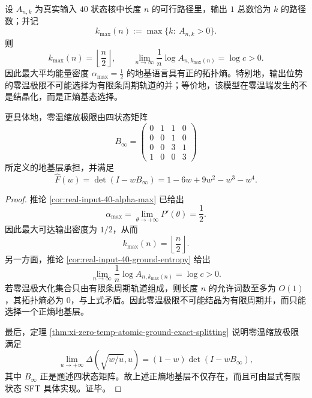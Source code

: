 \begin{theorem}[零温极限的非结晶化选择]\label{thm:conclusion-realinput40-zero-temp-noncrystallization}
设 \(A_{n,k}\) 为真实输入 \(40\) 状态核中长度 \(n\) 的可行路径里，输出 \(1\) 总数恰为 \(k\) 的路径数；并记
\[
k_{\max}(n):=\max\{k:\ A_{n,k}>0\}.
\]
则
\[
k_{\max}(n)=\left\lfloor \frac n2\right\rfloor,
\qquad
\lim_{n\to\infty}\frac1n\log A_{n,k_{\max}(n)}=\log c>0.
\]
因此最大平均能量密度 \(\alpha_{\max}=\frac12\) 的地基语言具有正的拓扑熵。特别地，输出位势的零温极限不可能选择为有限条周期轨道的并；等价地，该模型在零温端发生的不是结晶化，而是正熵基态选择。

更具体地，零温缩放极限由四状态矩阵
\[
B_\infty=
\begin{pmatrix}
0&1&1&0\\
0&0&1&0\\
0&0&3&1\\
1&0&0&3
\end{pmatrix}
\]
所定义的地基层承担，并满足
\[
\widehat F(w)=\det(I-wB_\infty)=1-6w+9w^2-w^3-w^4.
\]
\end{theorem}
\begin{proof}
推论 \ref{cor:real-input-40-alpha-max} 已给出
\[
\alpha_{\max}=\lim_{\theta\to+\infty}P'(\theta)=\frac12.
\]
因此最大可达输出密度为 \(1/2\)，从而
\[
k_{\max}(n)=\left\lfloor \frac n2\right\rfloor.
\]
另一方面，推论 \ref{cor:real-input-40-ground-entropy} 给出
\[
\lim_{n\to\infty}\frac1n\log A_{n,k_{\max}(n)}=\log c>0.
\]
若零温极大化集合只由有限条周期轨道组成，则长度 \(n\) 的允许词数至多为 \(O(1)\)，其拓扑熵必为 \(0\)，与上式矛盾。因此零温极限不可能结晶为有限周期并，而只能选择一个正熵地基层。

最后，定理 \ref{thm:xi-zero-temp-atomic-ground-exact-splitting} 说明零温缩放极限满足
\[
\lim_{u\to+\infty}\Delta\!\left(\sqrt{w/u},u\right)
=
(1-w)\det(I-wB_\infty),
\]
其中 \(B_\infty\) 正是题述四状态矩阵。故上述正熵地基层不仅存在，而且可由显式有限状态 SFT 具体实现。证毕。
\end{proof}

